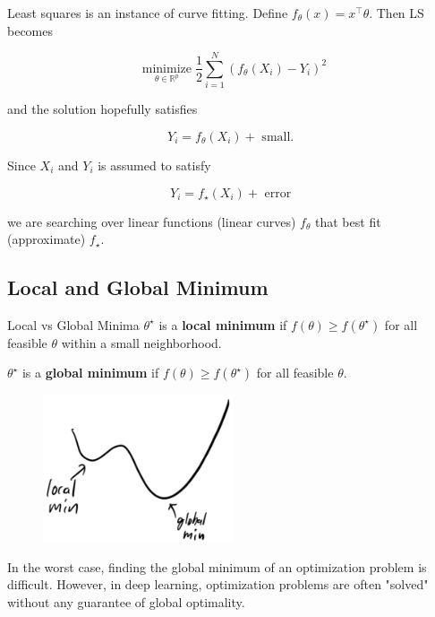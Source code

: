 \begin{frame}[allowframebreaks]

\begin{myconceptblock}{1.6}{Least squares is an instance of curve fitting.}
    Define $f_{\theta}(x)=x^{\top} \theta$.
    Then LS becomes

    $$
    \underset{\theta \in \mathbb{R}^{p}}{\operatorname{minimize}} \frac{1}{2} \sum_{i=1}^{N}\left(f_{\theta}\left(X_{i}\right)-Y_{i}\right)^{2}
    $$

    and the solution hopefully satisfies

    $$
    Y_{i}=f_{\theta}\left(X_{i}\right)+\text { small. }
    $$

    Since $X_{i}$ and $Y_{i}$ is assumed to satisfy

    $$
    Y_{i}=f_{\star}\left(X_{i}\right)+\text { error }
    $$

    we are searching over linear functions (linear curves) $f_{\theta}$ that best fit (approximate) $f_{\star}$.
\end{myconceptblock}

\end{frame}

\subsection{Local and Global Minimum}

\begin{frame}[allowframebreaks]

\begin{mydefinitionblock}{1.7}{Local vs Global Minima}
    $\theta^{\star}$ is a \textbf{local minimum} if $f(\theta) \geq f\left(\theta^{\star}\right)$ for all feasible $\theta$ within a small neighborhood.

    $\theta^{\star}$ is a \textbf{global minimum} if $f(\theta) \geq f\left(\theta^{\star}\right)$ for all feasible $\theta$.

    \begin{figure}[H]
        \centering
        \includegraphics[width=0.5\textwidth]{.././assets/1.1.jpg}
    \end{figure}

    In the worst case, finding the global minimum of an optimization problem is difficult.
    However, in deep learning, optimization problems are often "solved" without any guarantee of global optimality.
\end{mydefinitionblock}

\end{frame}
